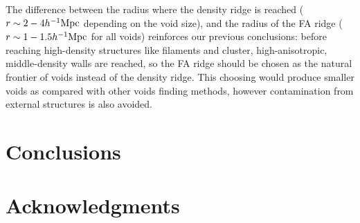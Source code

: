 \documentclass[a4,useAMS,usenatbib,usegraphicx]{mn2e}
\newcommand{\hMpc}{{\ifmmode{h^{-1}{\rm Mpc}}\else{$h^{-1}$Mpc}\fi}}
\begin{document}
The difference between the radius where the density ridge is reached 
($r\sim 2-4\hMpc$ depending on the void size), and the radius of the FA 
ridge ($r\sim 1-1.5\hMpc$ for all voids) reinforces our previous 
conclusions: before reaching high-density structures like filaments and 
cluster, high-anisotropic, middle-density walls are reached, so the FA 
ridge should be chosen as the natural frontier of voids instead of the
density ridge. This choosing would produce smaller voids as compared with
other voids finding methods, however contamination from external structures
is also avoided.


\section{Conclusions}
\label{sec:conclusions}


\section*{Acknowledgments}  



\end{document}
